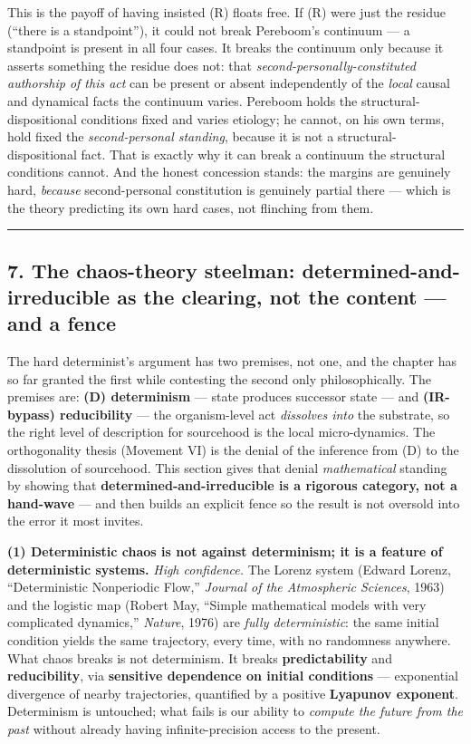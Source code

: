 \documentclass[11pt]{article}
\begin{document}
This is the payoff of having insisted (R) floats free. If (R) were just the residue (``there is a standpoint''), it could not break Pereboom's continuum — a standpoint is present in all four cases. It breaks the continuum only because it asserts something the residue does not: that \emph{second-personally-constituted authorship of this act} can be present or absent independently of the \emph{local} causal and dynamical facts the continuum varies. Pereboom holds the structural-dispositional conditions fixed and varies etiology; he cannot, on his own terms, hold fixed the \emph{second-personal standing}, because it is not a structural-dispositional fact. That is exactly why it can break a continuum the structural conditions cannot. And the honest concession stands: the margins are genuinely hard, \emph{because} second-personal constitution is genuinely partial there — which is the theory predicting its own hard cases, not flinching from them.

\medskip\noindent\rule{\linewidth}{0.3pt}\medskip

\subsection*{7. The chaos-theory steelman: determined-and-irreducible as the clearing, not the content — and a fence}

The hard determinist's argument has two premises, not one, and the chapter has so far granted the first while contesting the second only philosophically. The premises are: \textbf{(D) determinism} — state produces successor state — and \textbf{(IR-bypass) reducibility} — the organism-level act \emph{dissolves into} the substrate, so the right level of description for sourcehood is the local micro-dynamics. The orthogonality thesis (Movement VI) is the denial of the inference from (D) to the dissolution of sourcehood. This section gives that denial \emph{mathematical} standing by showing that \textbf{determined-and-irreducible is a rigorous category, not a hand-wave} — and then builds an explicit fence so the result is not oversold into the error it most invites.

\textbf{(1) Deterministic chaos is not against determinism; it is a feature of deterministic systems.} \emph{High confidence.} The Lorenz system (Edward Lorenz, ``Deterministic Nonperiodic Flow,'' \emph{Journal of the Atmospheric Sciences}, 1963) and the logistic map (Robert May, ``Simple mathematical models with very complicated dynamics,'' \emph{Nature}, 1976) are \emph{fully deterministic}: the same initial condition yields the same trajectory, every time, with no randomness anywhere. What chaos breaks is not determinism. It breaks \textbf{predictability} and \textbf{reducibility}, via \textbf{sensitive dependence on initial conditions} — exponential divergence of nearby trajectories, quantified by a positive \textbf{Lyapunov exponent}. Determinism is untouched; what fails is our ability to \emph{compute the future from the past} without already having infinite-precision access to the present.
\end{document}

